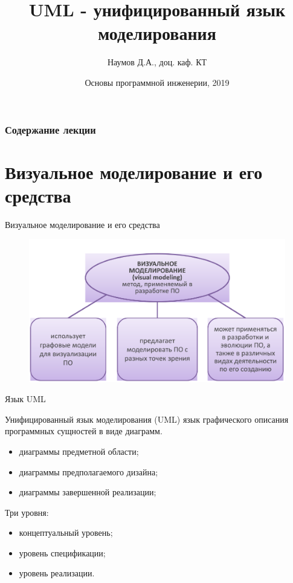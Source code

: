 \documentclass{beamer}
\title[Software Design]{UML - унифицированный язык моделирования}
\author{Наумов Д.А., доц. каф. КТ}
\date[16.09.2019] {Основы программной инженерии, 2019}
\begin{document}
\begin{frame}
  \titlepage
\end{frame}
  
\begin{frame}
  \frametitle{Содержание лекции}
  \tableofcontents  
\end{frame}
  
\section{Визуальное моделирование и его средства}

\begin{frame}[t]{Визуальное моделирование и его средства}
\begin{figure}[h]
\centering
\includegraphics[scale=0.45]{images/lec03-pic01.png}
\end{figure}
\end{frame} 

\begin{frame}[t]{Язык UML}
\begin{block}{Унифицированный язык моделирования (UML)}
язык графического описания программных сущностей в виде диаграмм.
\end{block}
\begin{itemize}
\item диаграммы предметной области;
\item диаграммы предполагаемого дизайна;
\item диаграммы завершенной реализации;
\end{itemize}
Три уровня:
\begin{itemize}
\item концептуальный уровень;
\item уровень спецификации;
\item уровень реализации.
\end{itemize}
\end{frame}
\end{document}

